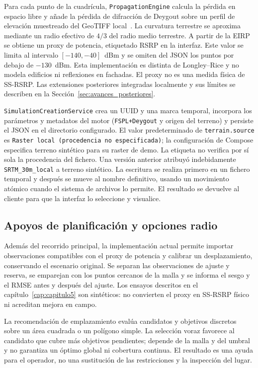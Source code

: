 Para cada punto de la cuadrícula, \texttt{PropagationEngine} calcula la pérdida en espacio
libre y añade la pérdida de difracción de Deygout sobre un perfil de elevación muestreado
del GeoTIFF local~\cite{deygout1966multiple}. La curvatura terrestre se aproxima mediante
un radio efectivo de $4/3$ del radio medio terrestre. A partir de la EIRP se obtiene un
proxy de potencia, etiquetado RSRP en la interfaz. Este valor se limita al intervalo
$[-140,-40]$~dBm y se omiten del JSON los puntos por debajo de
$-130$~dBm. Esta implementación es distinta de Longley--Rice y no modela
edificios ni reflexiones en fachadas. El proxy no es una medida física de SS-RSRP.
Las extensiones posteriores integradas localmente y sus límites se describen en la
Sección~\ref{sec:avances_posteriores}.

\texttt{SimulationCreationService} crea un UUID y una marca temporal, incorpora los
parámetros y metadatos del motor (\texttt{FSPL+Deygout} y origen del terreno)
y persiste el JSON en el directorio configurado. El valor predeterminado de
\texttt{terrain.source} es \texttt{Raster local (procedencia no especificada)};
la configuración de Compose especifica terreno sintético para su raster de demo.
La etiqueta no verifica por sí sola la procedencia del fichero. Una versión anterior
atribuyó indebidamente \texttt{SRTM\_30m\_local} a terreno sintético. La escritura
se realiza primero en un fichero temporal y después se mueve al nombre definitivo, usando
un movimiento atómico cuando el sistema de archivos lo permite. El resultado se devuelve
al cliente para que la interfaz lo seleccione y visualice.

\subsection{Apoyos de planificación y opciones radio}
\label{sec:apoyos_planificacion}

Además del recorrido principal, la implementación actual permite importar observaciones
compatibles con el proxy de potencia y calibrar un desplazamiento, conservando el
escenario original. Se separan las observaciones de ajuste y reserva, se emparejan con
los puntos cercanos de la malla y se informa el sesgo y el RMSE antes y después del
ajuste. Los ensayos descritos en el capítulo~\ref{cap:capitulo5} son sintéticos: no
convierten el proxy en SS-RSRP físico ni acreditan mejora en campo.

La recomendación de emplazamiento evalúa candidatos y objetivos discretos sobre un
área cuadrada o un polígono simple. La selección voraz favorece al candidato que cubre
más objetivos pendientes; depende de la malla y del umbral y no garantiza un óptimo
global ni cobertura continua. El resultado es una ayuda para el operador, no una
sustitución de las restricciones y la inspección del lugar.

